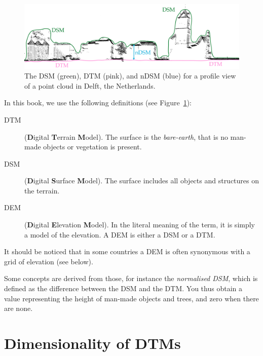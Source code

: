 \begin{figure}
  \includegraphics[width=0.9\linewidth]{figs/destm}
  \caption{The DSM (green), DTM (pink), and nDSM (blue) for a profile view of a point cloud in Delft, the Netherlands.}%
\label{fig:dtmdsm}
\end{figure}
In this book, we use the following definitions (see Figure~\ref{fig:dtmdsm}):
\begin{description}
  \item[DTM] (\textbf{D}igital \textbf{T}errain \textbf{M}odel). The surface is the \emph{bare-earth}, that is no man-made objects or vegetation is present.
  \item[DSM] (\textbf{D}igital \textbf{S}urface \textbf{M}odel). The surface includes all objects and structures on the terrain.
  \item[DEM] (\textbf{D}igital \textbf{E}levation \textbf{M}odel). In the literal meaning of the term, it is simply a model of the elevation. A DEM is either a DSM or a DTM\@. 
\end{description}

It should be noticed that in some countries a DEM is often synonymous with a grid of elevation (see below).

Some concepts are derived from those, for instance the \emph{normalised DSM},%
which is defined as the difference between the DSM and the DTM\@.
You thus obtain a value representing the height of man-made objects and trees, and zero when there are none.




%
\section{Dimensionality of DTMs}

